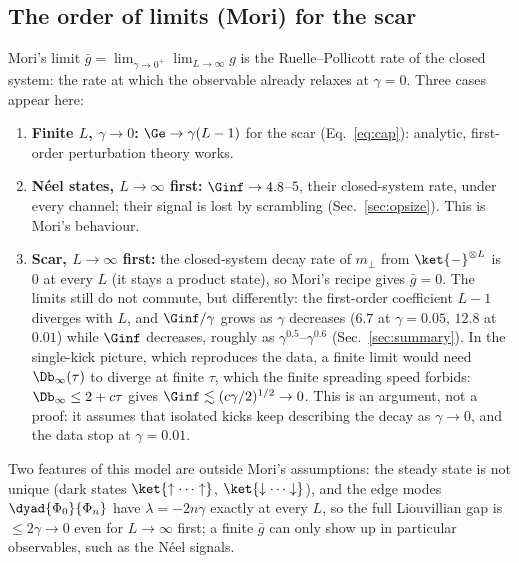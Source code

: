\subsection{The order of limits (Mori) for the scar}
\label{sec:mori}

Mori's limit $\bar g = \lim_{\gamma\to0^+}\lim_{L\to\infty} g$ is the Ruelle--Pollicott rate of the closed system: the rate at which the observable already relaxes at $\gamma = 0$. Three cases appear here:
\begin{enumerate}
\item \textbf{Finite $L$, $\gamma \to 0$:} $\Ge \to \gamma(L - 1)$ for the scar (Eq.~\eqref{eq:cap}): analytic, first-order perturbation theory works.
\item \textbf{N\'eel states, $L \to \infty$ first:} $\Ginf \to 4.8$--$5$, their closed-system rate, under every channel; their signal is lost by scrambling (Sec.~\ref{sec:opsize}). This is Mori's behaviour.
\item \textbf{Scar, $L \to \infty$ first:} the closed-system decay rate of $m_\perp$ from $\ket{-}^{\otimes L}$ is $0$ at every $L$ (it stays a product state), so Mori's recipe gives $\bar g = 0$. The limits still do not commute, but differently: the first-order coefficient $L - 1$ diverges with $L$, and $\Ginf/\gamma$ grows as $\gamma$ decreases ($6.7$ at $\gamma = 0.05$, $12.8$ at $0.01$) while $\Ginf$ decreases, roughly as $\gamma^{0.5}$--$\gamma^{0.6}$ (Sec.~\ref{sec:summary}). In the single-kick picture, which reproduces the data, a finite limit would need $\Db_\infty(\tau)$ to diverge at finite $\tau$, which the finite spreading speed forbids: $\Db_\infty \le 2 + c\tau$ gives $\Ginf \lesssim (c\gamma/2)^{1/2} \to 0$. This is an argument, not a proof: it assumes that isolated kicks keep describing the decay as $\gamma \to 0$, and the data stop at $\gamma = 0.01$.
\end{enumerate}
Two features of this model are outside Mori's assumptions: the steady state is not unique (dark states $\ket{\uparrow\cdots\uparrow}$, $\ket{\downarrow\cdots\downarrow}$), and the edge modes $\dyad{\Phi_0}{\Phi_n}$ have $\lambda = -2n\gamma$ exactly at every $L$, so the full Liouvillian gap is $\le 2\gamma \to 0$ even for $L \to \infty$ first; a finite $\bar g$ can only show up in particular observables, such as the N\'eel signals.
